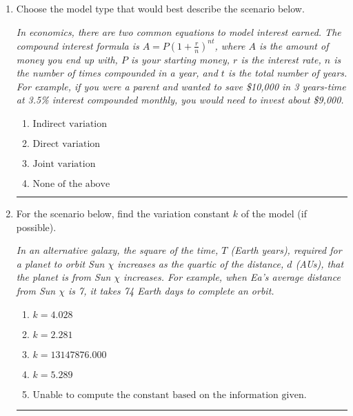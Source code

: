 \documentclass[14pt]{extbook}
\newcommand{\litem}[1]{\item#1\hspace*{-1cm}\rule{\textwidth}{0.4pt}}
\begin{document}
\begin{enumerate}
\litem{
Choose the model type that would best describe the scenario below.
\begin{center}
    \textit{ In economics, there are two common equations to model interest earned. The compound interest formula is $A = P (1 + \frac{r}{n})^{nt}$, where $A$ is the amount of money you end up with, $P$ is your starting money, $r$ is the interest rate, $n$ is the number of times compounded in a year, and $t$ is the total number of years. For example, if you were a parent and wanted to save \$10,000 in 3 years-time at 3.5\% interest compounded monthly, you would need to invest about \$9,000. }
\end{center}
\begin{enumerate}[label=\Alph*.]
\item \( \text{Indirect variation} \)
\item \( \text{Direct variation} \)
\item \( \text{Joint variation} \)
\item \( \text{None of the above} \)

\end{enumerate} }
\litem{
For the scenario below, find the variation constant $k$ of the model (if possible).
\begin{center}
    \textit{ In an alternative galaxy, the square of the time, $T$ (Earth years), required for a planet to orbit Sun $\chi$ increases as the quartic of the distance, $d$ (AUs), that the planet is from Sun $\chi$ increases. For example, when Ea's average distance from Sun $\chi$ is 7, it takes 74 Earth days to complete an orbit. }
\end{center}
\begin{enumerate}[label=\Alph*.]
\item \( k = 4.028 \)
\item \( k = 2.281 \)
\item \( k = 13147876.000 \)
\item \( k = 5.289 \)
\item \( \text{Unable to compute the constant based on the information given.} \)


\end{enumerate}}
\end{enumerate}
\end{document}
